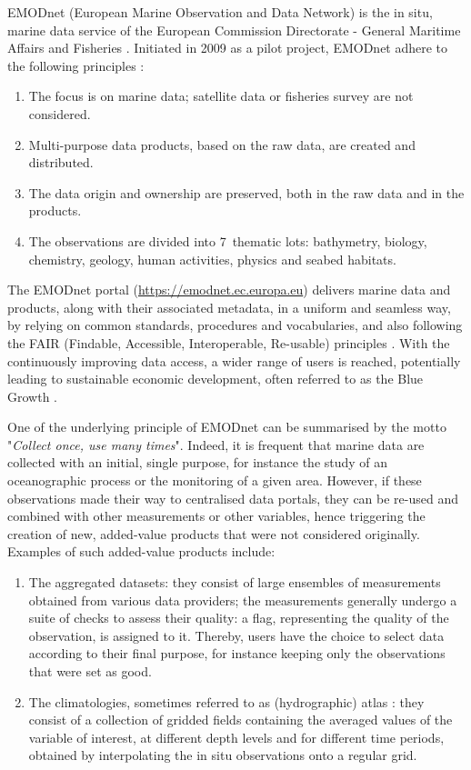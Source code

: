 \documentclass[essd, manuscript]{copernicus}
\begin{document}
\introduction 

EMODnet (European Marine Observation and Data Network) is the in situ, marine data service of the European Commission Directorate - General Maritime Affairs and Fisheries \citep{MartinMiguez2019}. Initiated in 2009 as a pilot project, EMODnet adhere to the following principles \citep{Shepherd2018}: 
\begin{enumerate}
\item The focus is on marine data; satellite data or fisheries survey are not considered. 
\item Multi-purpose data products, based on the raw data, are created and distributed. 
\item The data origin and ownership are preserved, both in the raw data and in the products. 
\item The observations are divided into 7~thematic lots: bathymetry, biology, chemistry, geology, human activities, physics and seabed habitats. 
\end{enumerate} 

The EMODnet portal (\url{https://emodnet.ec.europa.eu}) delivers marine data and products, along with their associated metadata, in a uniform and seamless way, by relying on common standards, procedures and vocabularies, and also following the FAIR (Findable, Accessible, Interoperable, Re-usable) principles \citep {Wilkinson2016,Wilkinson2019}. With the continuously improving data access, a wider range of users is reached, potentially leading to sustainable economic development, often referred to as the Blue Growth \citep{Commission2012}. 

One of the underlying principle of EMODnet can be summarised by the motto "\textit{Collect once, use many times}". Indeed, it is frequent that marine data are collected with an initial, single purpose, for instance the study of an oceanographic process or the monitoring of a given area. However, if these observations made their way to centralised data portals, they can be re-used and combined with other measurements or other variables, hence triggering the creation of new, added-value products that were not considered originally. Examples of such added-value products include:
\begin{enumerate}
\item The aggregated datasets: they consist of large ensembles of measurements obtained from various data providers; the measurements generally undergo a suite of checks to assess their quality: a flag, representing the quality of the observation, is assigned to it. Thereby, users have the choice to select data according to their final purpose, for instance keeping only the observations that were set as good.
\item The climatologies, sometimes referred to as (hydrographic) atlas \citep[e.g.][]{soton16209,Iona_2018}: they consist of a collection of gridded fields containing the averaged values of the variable of interest, at different depth levels and for different time periods, obtained by interpolating the in situ observations onto a regular grid.
\end{enumerate}
\end{document}
